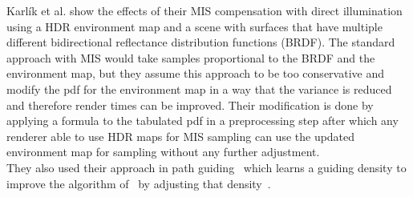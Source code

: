 Karl\'ik et al. show the effects of their MIS compensation with direct illumination using a HDR environment map
and a scene with surfaces that have multiple different bidirectional reflectance distribution functions (BRDF).
The standard approach with MIS would take samples proportional to the BRDF and the environment map,
but they assume this approach to be too conservative and modify the pdf for the environment map in a way that the variance is reduced
and therefore render times can be improved.
Their modification is done by applying a formula to the tabulated pdf in a preprocessing step
after which any renderer able to use HDR maps for MIS sampling can use the updated environment map for sampling without any further adjustment.\\
They also used their approach in path guiding~\cite{Vorba_2019} which learns a guiding density to improve the algorithm of~\cite{mueller2017} by adjusting that density~\cite{Karlik2019}.


